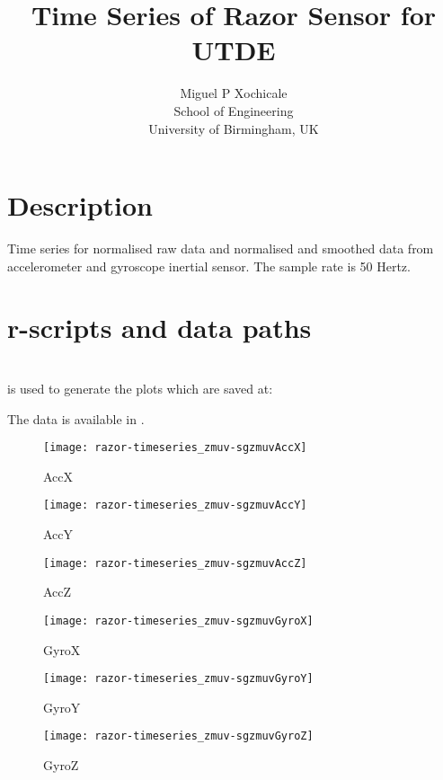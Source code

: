 \documentclass[a4paper,12pt]{article}
\title{Time Series of Razor Sensor for UTDE}
\author{Miguel P Xochicale \\
School of Engineering\\
University of Birmingham, UK}
\begin{document}
\maketitle



\section{Description}
Time series for normalised raw data and normalised and smoothed data from  accelerometer and gyroscope inertial sensor.
The sample rate is 50 Hertz. 


\section{r-scripts and data paths}
 \\
is used to generate the plots which are saved at: \\

The data is available in \cite{mxochicale2018}.









\begin{figure}
\centering
\texttt{[image: razor-timeseries\_zmuv-sgzmuvAccX]}
\caption{AccX}
\end{figure}



\begin{figure}
\centering
\texttt{[image: razor-timeseries\_zmuv-sgzmuvAccY]}
\caption{AccY}
\end{figure}



\begin{figure}
\centering
\texttt{[image: razor-timeseries\_zmuv-sgzmuvAccZ]}
\caption{AccZ}
\end{figure}



\begin{figure}
\centering
\texttt{[image: razor-timeseries\_zmuv-sgzmuvGyroX]}
\caption{GyroX}
\end{figure}



\begin{figure}
\centering
\texttt{[image: razor-timeseries\_zmuv-sgzmuvGyroY]}
\caption{GyroY}
\end{figure}



\begin{figure}
\centering
\texttt{[image: razor-timeseries\_zmuv-sgzmuvGyroZ]}
\caption{GyroZ}
\end{figure}
\end{document}
